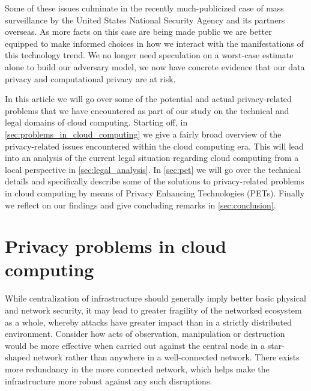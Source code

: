 \documentclass[11pt, a4paper]{article}
\begin{document}
Some of these issues culminate in the recently much-publicized case of mass surveillance by the United States National Security Agency and its partners overseas.
As more facts on this case are being made public we are better equipped to make informed choices in how we interact with the manifestations of this technology trend.
We no longer need speculation on a worst-case estimate alone to build our adversary model, we now have concrete evidence that our data privacy and computational privacy are at risk.

In this article we will go over some of the potential and actual privacy-related problems that we have encountered as part of our study on the technical and legal domains of cloud computing. Starting off, in \autoref{sec:problems_in_cloud_computing} we give a fairly broad overview of the privacy-related issues encountered within the cloud computing era.
This will lead into an analysis of the current legal situation regarding cloud computing from a local perspective in \autoref{sec:legal_analysis}. In \autoref{sec:pet} we will go over the technical details and specifically describe some of the solutions to privacy-related problems in cloud computing by means of Privacy Enhancing Technologies (PETs). Finally we reflect on our findings and give concluding remarks in \autoref{sec:conclusion}.

\section{Privacy problems in cloud computing}
\label{sec:problems_in_cloud_computing}

While centralization of infrastructure should generally imply better basic physical and network security, it may lead to greater fragility of the networked ecosystem as a whole, whereby attacks have greater impact than in a strictly distributed environment.
Consider how acts of observation, manipulation or destruction would be more effective when carried out against the central node in a star-shaped network rather than anywhere in a well-connected network.
There exists more redundancy in the more connected network, which helps make the infrastructure more robust against any such disruptions.
\end{document}
